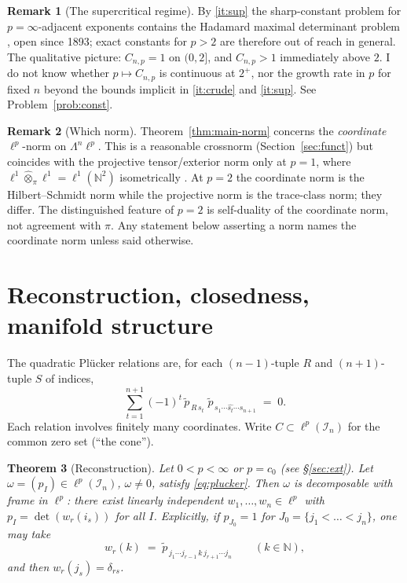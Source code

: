 \documentclass[11pt]{amsart}
\newtheorem{theorem}{Theorem}[section]
\theoremstyle{definition}
\newtheorem{remark}[theorem]{Remark}
\newcommand{\N}{\mathbb{N}}
\begin{document}
\begin{remark}[The supercritical regime]\label{rem:maxdet}
By \ref{it:sup} the sharp-constant problem for $p=\infty$-adjacent exponents contains the Hadamard maximal determinant problem \cite{Had}, open since 1893; exact constants for $p>2$ are therefore out of reach in general. The qualitative picture: $C_{n,p}=1$ on $(0,2]$, and $C_{n,p}>1$ immediately above $2$. I do not know whether $p\mapsto C_{n,p}$ is continuous at $2^+$, nor the growth rate in $p$ for fixed $n$ beyond the bounds implicit in \ref{it:crude} and \ref{it:sup}. See Problem~\ref{prob:const}.
\end{remark}

\begin{remark}[Which norm]\label{rem:whichnorm}
Theorem~\ref{thm:main-norm} concerns the \emph{coordinate} $\ell^p$-norm on $\Lambda^n\ell^p$. This is a reasonable crossnorm (Section~\ref{sec:funct}) but coincides with the projective tensor/exterior norm only at $p=1$, where $\ell^1\widehat\otimes_\pi\ell^1=\ell^1(\N^2)$ isometrically \cite[\S2.3]{Ryan}. At $p=2$ the coordinate norm is the Hilbert--Schmidt norm while the projective norm is the trace-class norm; they differ. The distinguished feature of $p=2$ is self-duality of the coordinate norm, not agreement with $\pi$. Any statement below asserting a norm names the coordinate norm unless said otherwise.
\end{remark}

\section{Reconstruction, closedness, manifold structure}\label{sec:recon}

The quadratic Pl\"ucker relations are, for each $(n-1)$-tuple $R$ and $(n+1)$-tuple $S$ of indices,
\begin{equation}\label{eq:plucker}
\sum_{t=1}^{n+1}(-1)^t\,\tilde p_{\,R\,s_t}\;\tilde p_{\,s_1\cdots \widehat{s_t}\cdots s_{n+1}}\;=\;0 .
\end{equation}
Each relation involves finitely many coordinates. Write $C\subset\ell^p(\mathcal I_n)$ for the common zero set (``the cone'').

\begin{theorem}[Reconstruction]\label{thm:recon}
Let $0<p<\infty$ or $p=c_0$ \textup{(}see \S\ref{sec:ext}\textup{)}. Let $\omega=(p_I)\in\ell^p(\mathcal I_n)$, $\omega\ne0$, satisfy \eqref{eq:plucker}. Then $\omega$ is decomposable with frame in $\ell^p$: there exist linearly independent $w_1,\dots,w_n\in\ell^p$ with $p_I=\det(w_r(i_s))$ for all $I$. Explicitly, if $p_{J_0}=1$ for $J_0=\{j_1<\dots<j_n\}$, one may take
\[
w_r(k)\;=\;\tilde p_{\,j_1\cdots j_{r-1}\,k\,j_{r+1}\cdots j_n}\qquad(k\in\N),
\]
and then $w_r(j_s)=\delta_{rs}$.
\end{theorem}
\end{document}
